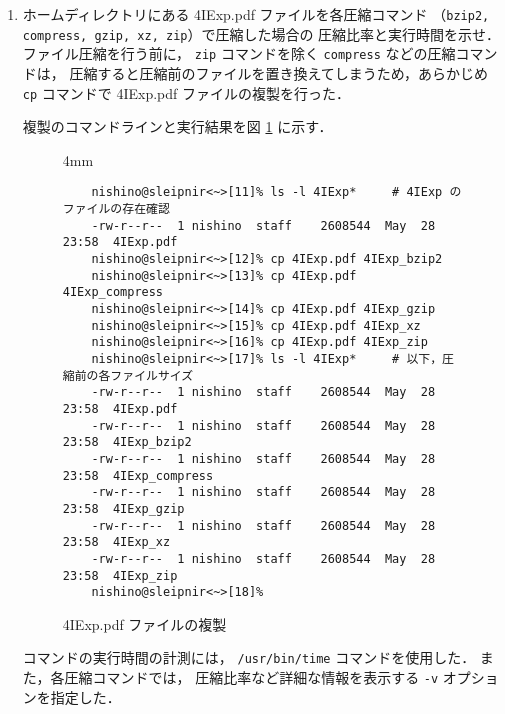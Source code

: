 \documentclass[a4j]{jreport}
\begin{document}
\begin{enumerate}[labelindent=\parindent, leftmargin=*, label=課題 \arabic*）]
  \item ホームディレクトリにある 4IExp.pdf ファイルを各圧縮コマンド
	（\texttt{bzip2, compress, gzip, xz, zip}）で圧縮した場合の
	圧縮比率と実行時間を示せ．\\


	ファイル圧縮を行う前に，
	\texttt{zip} コマンドを除く \texttt{compress} などの圧縮コマンドは，
	圧縮すると圧縮前のファイルを置き換えてしまうため，あらかじめ
	\texttt{cp} コマンドで 4IExp.pdf ファイルの複製を行った．

	複製のコマンドラインと実行結果を図 \ref{Figure: copy of file} に示す．

	  \begin{figure}[H]
	    \centering
	      \begin{screen}[3]
	        \setlength{\baselineskip} {4mm}
	        \begin{verbatim}
	nishino@sleipnir<~>[11]% ls -l 4IExp*     # 4IExp のファイルの存在確認
	-rw-r--r--  1 nishino  staff    2608544  May  28 23:58  4IExp.pdf
	nishino@sleipnir<~>[12]% cp 4IExp.pdf 4IExp_bzip2
	nishino@sleipnir<~>[13]% cp 4IExp.pdf 4IExp_compress
	nishino@sleipnir<~>[14]% cp 4IExp.pdf 4IExp_gzip
	nishino@sleipnir<~>[15]% cp 4IExp.pdf 4IExp_xz
	nishino@sleipnir<~>[16]% cp 4IExp.pdf 4IExp_zip
	nishino@sleipnir<~>[17]% ls -l 4IExp*     # 以下，圧縮前の各ファイルサイズ
	-rw-r--r--  1 nishino  staff    2608544  May  28 23:58  4IExp.pdf
	-rw-r--r--  1 nishino  staff    2608544  May  28 23:58  4IExp_bzip2
	-rw-r--r--  1 nishino  staff    2608544  May  28 23:58  4IExp_compress
	-rw-r--r--  1 nishino  staff    2608544  May  28 23:58  4IExp_gzip
	-rw-r--r--  1 nishino  staff    2608544  May  28 23:58  4IExp_xz
	-rw-r--r--  1 nishino  staff    2608544  May  28 23:58  4IExp_zip
	nishino@sleipnir<~>[18]%
	        \end{verbatim}
	        \vspace*{-18pt}
	      \end{screen}
	      \caption{4IExp.pdf ファイルの複製}
	      \label{Figure: copy of file}
	  \end{figure}

	コマンドの実行時間の計測には，
	\texttt{/usr/bin/time} コマンドを使用した．
	また，各圧縮コマンドでは，
	圧縮比率など詳細な情報を表示する \texttt{-v} オプションを指定した．


\end{enumerate}
\end{document}
